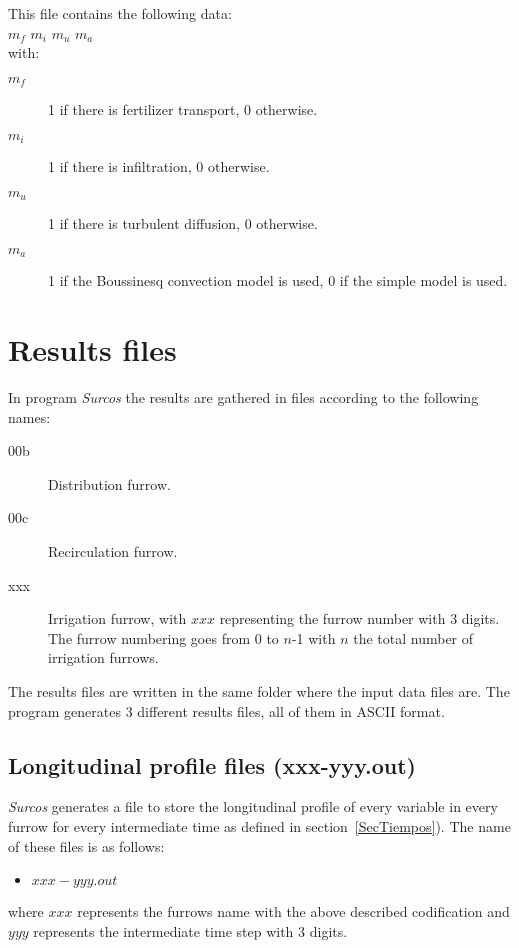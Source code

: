 This file contains the following data:\\
$m_f$ $m_i$ $m_u$ $m_a$\\
with:
\begin{description}
\item[$m_f$] 1 if there is fertilizer transport, 0 otherwise.
\item[$m_i$] 1 if there is infiltration, 0 otherwise.
\item[$m_u$] 1 if there is turbulent diffusion, 0 otherwise.
\item[$m_a$] 1 if the Boussinesq convection model is used, 0 if the simple model is used.
\end{description}

\section{Results files}

In program \emph{Surcos} the results are gathered in files according to the following names: 
\begin{description}
\item[00b] Distribution furrow.
\item[00c] Recirculation furrow.
\item[xxx] Irrigation furrow, with $xxx$ representing the furrow number with 3
	digits. The furrow numbering goes from 0 to $n$-1 with $n$ the total number of irrigation furrows.
\end{description}

The results files are written in the same folder where the input data files are. The program generates
3 different results files, all of them in ASCII format.

\subsection{Longitudinal profile files (xxx-yyy.out)}

\emph{Surcos} generates a file to store the longitudinal profile of every variable in every furrow for every
intermediate time as defined in section~\ref{SecTiempos}). The name of these files is as follows:

\begin{itemize}
\item $xxx-yyy.out$
\end{itemize}
where $xxx$ represents the furrows name with the above described codification and $yyy$ represents
the intermediate time step with 3 digits.

